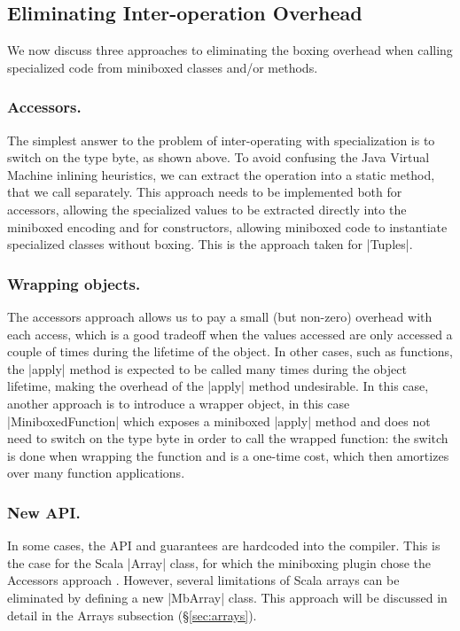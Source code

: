\subsection{Eliminating Inter-operation Overhead}

We now discuss three approaches to eliminating the boxing overhead when calling specialized code from miniboxed classes and/or methods.

\subsubsection{Accessors.} The simplest answer to the problem of inter-operating with specialization is to switch on the type byte, as shown above. To avoid confusing the Java Virtual Machine inlining heuristics, we can extract the operation into a static method, that we call separately. This approach needs to be implemented both for accessors, allowing the specialized values to be extracted directly into the miniboxed encoding and for constructors, allowing miniboxed code to instantiate specialized classes without boxing. This is the approach taken for |Tuples|.

\subsubsection{Wrapping objects.} The accessors approach allows us to pay a small (but non-zero) overhead with each access, which is a good tradeoff when the values accessed are only accessed a couple of times during the lifetime of the object. In other cases, such as functions, the |apply| method is expected to be called many times during the object lifetime, making the overhead of the |apply| method undesirable. In this case, another approach is to introduce a wrapper object, in this case |MiniboxedFunction| which exposes a miniboxed |apply| method and does not need to switch on the type byte in order to call the wrapped function: the switch is done when wrapping the function and is a one-time cost, which then amortizes over many function applications.

\subsubsection{New API.} In some cases, the API and guarantees are hardcoded into the compiler. This is the case for the Scala |Array| class, for which the miniboxing plugin chose the Accessors approach \cite{miniboxing}. However, several limitations of Scala arrays can be eliminated by defining a new |MbArray| class. This approach will be discussed in detail in the Arrays subsection (\S\ref{sec:arrays}).

